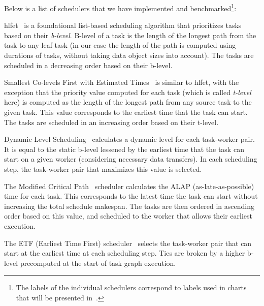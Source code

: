 Below is a list of schedulers that we have implemented and benchmarked\footnote{The labels of the individual schedulers correspond to labels used in charts that will be presented
in~.}:

\begin{description}[wide=0pt]
	\item[blevel] \gls{hlfet}~\cite{hlfet1974} is a
		foundational list-based scheduling algorithm that prioritizes tasks based on their
		\emph{b-level}. B-level of a task is the length of the longest path from the task to any
		leaf task (in our case the length of the path is computed using durations of tasks, without taking
		data object sizes into account). The tasks are scheduled in a decreasing order based on their
		b-level.

	\item[tlevel]
		Smallest Co-levels First with Estimated Times~\cite{kwok1999static} is similar to
		\gls{hlfet}, with the exception that the priority value computed for each task (which is
		called \emph{t-level} here) is computed as the length of the longest path from any source
		task to the given task. This value corresponds to the earliest time that the task can start. The
		tasks are scheduled in an increasing order based on their t-level.

	\item[dls]
		Dynamic Level Scheduling~\cite{sih1993compile} calculates a dynamic level for each task-worker
		pair. It is equal to the static b-level lessened by the earliest time that the task can start on a
		given worker (considering necessary data transfers). In each scheduling step, the task-worker pair
		that maximizes this value is selected.

	\item[mcp]
		The Modified Critical Path~\cite{wu1990hypertool} scheduler calculates the ALAP
		(as-late-as-possible) time for each task. This corresponds to the latest time the task can start
		without increasing the total schedule makespan. The tasks are then ordered in ascending order based
		on this value, and scheduled to the worker that allows their earliest execution.

	\item[etf]
		The ETF (Earliest Time First) scheduler~\cite{hwang1989scheduling} selects the task-worker pair that
		can start at the earliest time at each scheduling step. Ties are broken by a higher b-level
		precomputed at the start of task graph execution.


\end{description}
